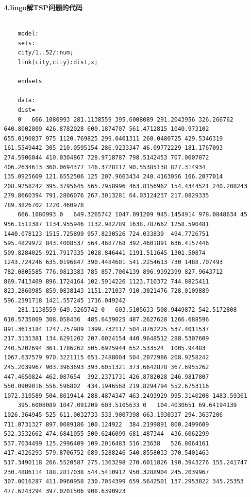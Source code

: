 \documentclass[UTF8]{ctexart}
\begin{document}
	\fontsize{14pt}{24pt}\begin{flushleft}
		\textbf{4.lingo解TSP问题的代码}
	\end{flushleft}
	\fontsize{12pt}{24pt} 
	\lstset{language=lingo}
	\begin{lstlisting}
	
	model:
	sets:
	city/1..52/:num;
	link(city,city):dist,x;

	endsets
	
	data:
	dist=
	0	666.1080993	281.1138559	395.6008089	291.2043956	326.266762	640.8002809	426.8782028	600.1874707	561.4712815	1040.973102	655.0190837	975	1120.769825	299.0401311	260.0480725	429.5346319	161.5549442	305	210.0595154	286.9233347	46.09772229	181.1767093	274.5906044	410.0304867	728.9718787	798.5142453	707.0007072	406.2634613	360.0694377	146.3728117	90.55385138	827.314934	135.0925609	121.6552506	125	207.9663434	240.4163056	166.2077014	208.9258242	395.3795645	565.7958996	463.8156962	154.4344521	240.208243	279.8660394	791.2806076	267.3013281	64.03124237	217.0829335	789.3826702	1220.460978
	666.1080993	0	649.3265742	1047.091209	945.1454914	978.0848634	45	956.1511387	1134.955946	1132.982789	1638.787662	1258.590481	1440.078123	1515.725899	957.8230526	724.033839	494.7726751	595.4829972	843.4008537	564.4687768	392.4601891	636.4157446	509.8284025	921.7917335	1028.846441	1191.511645	1301.50874	1243.724246	635.0196847	390.4484601	541.2254613	730	1488.707493	782.0805585	776.9813383	785	857.7004139	896.9392399	827.9643712	869.7413409	896.1724164	102.5914226	1123.710372	744.8825411	823.2860985	859.0838143	1151.271037	910.3021476	728.0109889	596.2591718	1421.557245	1716.049242
	281.1138559	649.3265742	0	603.5105633	508.9449872	542.5172808	610.5735009	308.058436	485.6439025	487.2627628	1266.688596	891.3613184	1247.757989	1399.732117	504.8762225	537.4011537	217.3131381	134.6291202	207.0024154	440.9648512	288.5307609	240.5202694	361.1786262	505.6925944	652.533524	1005.94483	1067.637579	970.3221115	651.2488004	504.2072986	208.9258242	245.2039967	903.3963693	393.6051321	373.6642878	367.6955262	447.4650824	462.087654	392.2371731	426.8782028	246.9817807	550.0909016	556.596802	434.1946568	219.8294794	552.6753116	1072.310589	504.8019414	288.4874347	463.2493929	995.3140208	1483.59361
	395.6008089	1047.091209	603.5105633	0	104.4030651	69.64194139	1026.364945	525	611.0032733	533.9007398	663.1930337	294.3637206	711.0731327	897.0089186	100.124922	384.2199891	800.2499609	532.3532662	474.6841055	500.6246099	681.487344	436.6062299	537.7034499	125.2996409	109.2016483	516.23638	526.8064161	417.4326293	579.8706752	689.5288246	540.8558033	370.5401463	517.3490118	266.5520587	275.1363298	270.6011826	190.3943276	155.241747	230.4886114	188.2817038	544.5410912	950.3288904	245.2039967	307.0016287	411.0960958	230.7054399	659.5642501	137.2953022	345.25353	477.6243294	397.0201506	908.6390923

\end{lstlisting}
\end{document}
